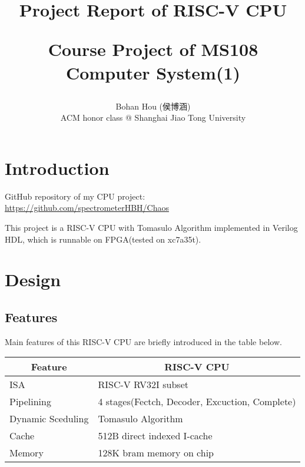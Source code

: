 \documentclass[12pt, a4paper]{article}
\title{Project Report of RISC-V CPU\\\begin{large}Course Project of MS108 Computer System(1)\end{large}}
\author{Bohan Hou (侯博涵)\\ACM honor class @ Shanghai Jiao Tong University}
\date{}
\theoremstyle{margin}
\begin{document}
\maketitle

\section{Introduction}

GitHub repository of my CPU project: \url{https://github.com/spectrometerHBH/Chaos}

This project is a RISC-V CPU with Tomasulo Algorithm implemented in Verilog HDL, which is runnable on FPGA(tested on xc7a35t).

\section{Design}

\subsection{Features}

Main features of this RISC-V CPU are briefly introduced in the table below.

\begin{table}[H]
\centering
\begin{tabular}{@{}ll@{}}
\toprule
\multicolumn{1}{c}{Feature} & \multicolumn{1}{c}{RISC-V CPU}                                                                        \\ \midrule
ISA                         & RISC-V RV32I subset\\
Pipelining                  & 4 stages(Fectch, Decoder, Excuction, Complete) \\
Dynamic Sceduling           & Tomasulo Algorithm \\
Cache                       & 512B direct indexed I-cache\\
Memory                      & 128K bram memory on chip \\ 
\bottomrule
\end{tabular}
\end{table}
\end{document}
